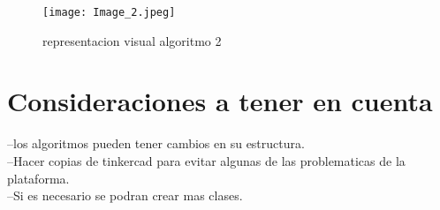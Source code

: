 \documentclass{article}
\begin{document}
\begin{figure}[h]
\texttt{[image: Image\_2.jpeg]}
\centering
\caption{representacion visual algoritmo 2}
\label{fig:Image_2}
\end{figure}

\section{Consideraciones a tener en cuenta}

--los algoritmos pueden tener cambios en su estructura.\\

--Hacer copias de tinkercad para evitar algunas de las problematicas de la plataforma.\\

--Si es necesario se podran crear mas clases.\\
\end{document}
